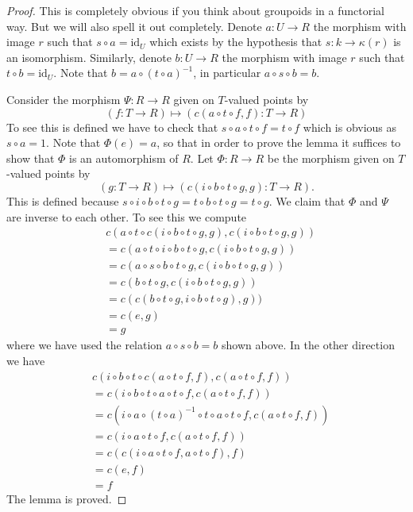 \documentclass{stacks-project}
\theoremstyle{plain}
\theoremstyle{definition}
\theoremstyle{remark}
\numberwithin{equation}{subsection}
\begin{document}
\begin{proof}
This is completely obvious if you think about groupoids in a
functorial way. But we will also spell it out completely.
Denote $a : U \to R$ the morphism with image $r$ such that
$s \circ a = \text{id}_U$ which exists by the hypothesis
that $s : k \to \kappa(r)$ is an isomorphism. Similarly, denote
$b : U \to R$ the morphism with image $r$ such that
$t \circ b = \text{id}_U$. Note that
$b = a \circ (t \circ a)^{-1}$, in particular
$a \circ s \circ b = b$.

\medskip\noindent
Consider the morphism $\Psi : R \to R$ given on $T$-valued points
by
$$
(f : T \to R) \longmapsto (c(a \circ t \circ f, f) : T \to R)
$$
To see this is defined we have to check that
$s \circ a \circ t \circ f = t \circ f$ which is obvious as $s \circ a = 1$.
Note that $\Phi(e) = a$, so that in order to prove the lemma it
suffices to show that $\Phi$ is an automorphism of $R$.
Let $\Phi : R \to R$ be the morphism given on $T$-valued points by
$$
(g : T \to R) \longmapsto (c(i \circ b \circ t \circ g, g) : T \to R).
$$
This is defined because
$s \circ i \circ b \circ t \circ g = t \circ b \circ t \circ g =
t \circ g$. We claim that $\Phi$ and $\Psi$ are inverse to
each other. To see this we compute
\begin{align*}
& c(a \circ t \circ c(i \circ b \circ t \circ g, g),
c(i \circ b \circ t \circ g, g)) \\
& =
c(a \circ t \circ i \circ b \circ t \circ g,
c(i \circ b \circ t \circ g, g)) \\
& =
c(a \circ s \circ b \circ t \circ g,
c(i \circ b \circ t \circ g, g)) \\
& =
c(b \circ t \circ g, c(i \circ b \circ t \circ g, g)) \\
& =
c(c(b \circ t \circ g, i \circ b \circ t \circ g), g)) \\
& =
c(e, g) \\
& = g
\end{align*}
where we have used the relation $a \circ s \circ b = b$ shown above.
In the other direction we have
\begin{align*}
& c(i \circ b \circ t \circ c(a \circ t \circ f, f), c(a \circ t \circ f, f)) \\
& =
c(i \circ b \circ t \circ a \circ t \circ f, c(a \circ t \circ f, f)) \\
& =
c(i \circ a \circ (t \circ a)^{-1} \circ t \circ a \circ t \circ f,
c(a \circ t \circ f, f)) \\
& =
c(i \circ a \circ t \circ f, c(a \circ t \circ f, f)) \\
& =
c(c(i \circ a \circ t \circ f, a \circ t \circ f), f) \\
& =
c(e, f) \\
& = f
\end{align*}
The lemma is proved.
\end{proof}
\end{document}
